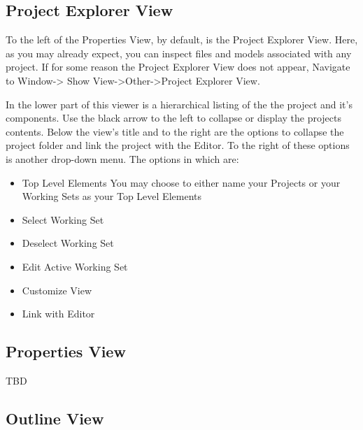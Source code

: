 {{{%
\subsection{Project Explorer View}

To the left of the Properties View, by default, is the Project Explorer View. Here, as you may already expect, you can inspect files and models associated with any project. If for some reason the Project Explorer View does not appear, Navigate to Window-> Show View->Other->Project Explorer View.

In the lower part of this viewer is a hierarchical listing of the the project and it's components. Use the black arrow to the left to collapse or display the projects contents. Below the view's title and to the right are the options to collapse the project folder and link the project with the Editor. To the right of these options is another drop-down menu. The options in which are:
\begin{itemize}
\item Top Level Elements You may choose to either name your Projects or your Working Sets as your Top Level Elements
\item Select Working Set
\item Deselect Working Set
\item Edit Active Working Set
\item Customize View
\item Link with Editor
\end{itemize}

\subsection{Properties View}

TBD

\subsection{Outline View}

}}}
